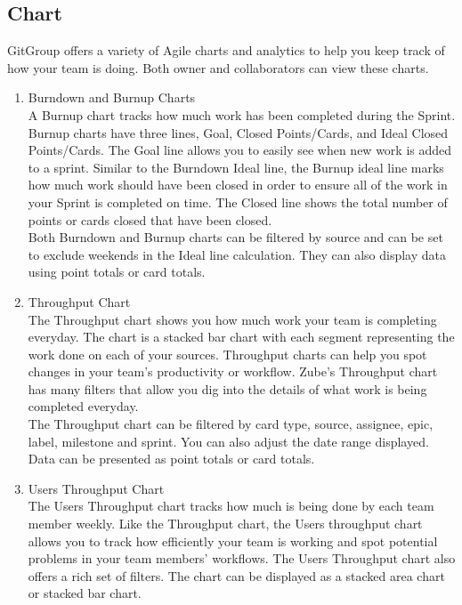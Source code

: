 \documentclass[12pt,a4paper]{report}
\begin{document}
\subsection{Chart}
GitGroup offers a variety of Agile charts and analytics to help you keep track of how your team is doing. Both owner and collaborators can view these charts.\cite{zube}
\begin{enumerate}
	\renewcommand{\labelenumi}{{\textbf{\arabic{enumi}.}}}
	\item Burndown and Burnup Charts\\
	A Burnup chart tracks how much work has been completed during the Sprint. Burnup charts have three lines, Goal, Closed Points/Cards, and Ideal Closed Points/Cards. The Goal line allows you to easily see when new work is added to a sprint. Similar to the Burndown Ideal line, the Burnup ideal line marks how much work should have been closed in order to ensure all of the work in your Sprint is completed on time. The Closed line shows the total number of points or cards closed that have been closed. \\
	Both Burndown and Burnup charts can be filtered by source and can be set to exclude weekends in the Ideal line calculation. They can also display data using point totals or card totals. 
	\item Throughput Chart\\
	The Throughput chart shows you how much work your team is completing everyday. The chart is a stacked bar chart with each segment representing the work done on each of your sources. Throughput charts can help you spot changes in your team's productivity or workflow. Zube's Throughput chart has many filters that allow you dig into the details of what work is being completed everyday.\\ 
	The Throughput chart can be filtered by card type, source, assignee, epic, label, milestone and sprint. You can also adjust the date range displayed. Data can be presented as point totals or card totals. 
	\item Users Throughput Chart\\
	The Users Throughput chart tracks how much is being done by each team member weekly. Like the Throughput chart, the Users throughput chart allows you to track how efficiently your team is working and spot potential problems in your team members' workflows. The Users Throughput chart also offers a rich set of filters. The chart can be displayed as a stacked area chart or stacked bar chart. \\

\end{enumerate}
\end{document}
